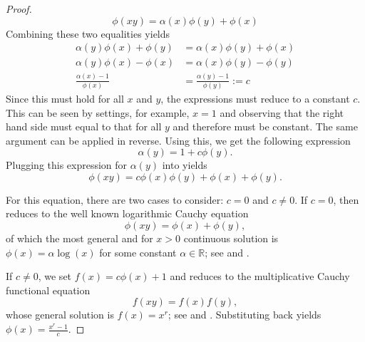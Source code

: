 \begin{proof}
  \begin{equation*}
    \phi(x y) = \alpha(x)\phi(y) + \phi(x)
  \end{equation*}
  Combining these two equalities yields
  \begin{align*}
    \alpha(y)\phi(x) + \phi(y)  &= \alpha(x)\phi(y) + \phi(x) \tag{$- \phi(x) - \phi(y)$} \\
    \alpha(y)\phi(x) - \phi(x)  &= \alpha(x)\phi(y) - \phi(y) \tag{divide \footnotemark by $\phi(x) \cdot \phi(y)$} \\
    \frac{\alpha(x) -1}{\phi(x)} &= \frac{\alpha(y) - 1}{\phi(y)} := c
  \end{align*} 
  Since this must hold for all $x$ and $y$, the expressions must reduce to a constant $c$. This can be seen by settings, for example, $x=1$ and observing that the right hand side must equal to that for all $y$ and therefore must be constant. The same argument can be applied in reverse.
  Using this, we get the following expression
  \begin{equation*}
    \alpha(y) = 1 + c \phi(y).
  \end{equation*}
  Plugging this expression for $\alpha(y)$ into  yields
  \begin{equation} \label{proof-quasi-eq1}
    \phi(xy) = c \phi(x) \phi(y) + \phi(x) + \phi(y).
  \end{equation}

  For this equation, there are two cases to consider: $c=0$ and $c \neq 0$.
  If $c=0$, then  reduces to the well known logarithmic Cauchy equation
  $$  \phi(xy) = \phi(x) + \phi(y), $$
  of which the most general and for $x>0$ continuous solution is $\phi(x) = \alpha \log(x)$ for some constant $\alpha \in \mathbb{R}$; see \parencite[p. 39]{aczel1966lectures} and \parencite[p. 110-111]{cauchy1821}.

  If $c \neq 0$, we set $f(x) = c \phi(x) + 1$ and  reduces to the multiplicative Cauchy functional equation
  $$ f(xy) = f(x)f(y), $$
  whose general solution is $f(x) = x^r$; see \parencite[p. 39]{aczel1966lectures} and \parencite[p. 111-112]{cauchy1821}. Substituting back yields $\phi(x) = \frac{x^r -1}{c}$.
\end{proof}


